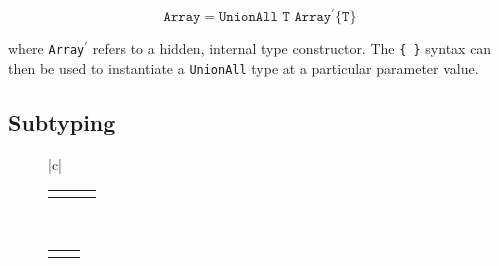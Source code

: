 \vspace{-3ex}
\[
\texttt{Array} = \texttt{UnionAll T Array$^\prime$\{T\}}
\]

\noindent
where \texttt{Array$^\prime$} refers to a hidden, internal type constructor.
The \texttt{\{ \}} syntax can then be used to instantiate a \texttt{UnionAll}
type at a particular parameter value.


\subsection{Subtyping}

\begin{figure}[!t]
  \begin{center}
    \def\arraystretch{2}
    \begin{tabular}{|c|}\hline
      \begin{tabular}{ccc}
        \AxiomC{$_A^B X^L, \Gamma\ \vdash\ T \leq S$}
        \UnaryInfC{$\Gamma\ \vdash\ \exists$ $_A^B X . T\ \leq\ S$}
        \DisplayProof

        \hspace{3ex}

        &

        \AxiomC{$_A^BX^R, \Gamma\ \vdash\ T \leq S$}
        \UnaryInfC{$\Gamma\ \vdash\ T\ \leq\ \exists$ $_A^B X . S$}
        \DisplayProof

        \hspace{3ex}

        &

        \AxiomC{}
        \UnaryInfC{$\Gamma\ \vdash\ X \leq X$}
        \DisplayProof
      \end{tabular}

      \\[8pt]

      \begin{tabular}{cc}
        \AxiomC{$^BX^L,\Gamma\ \vdash\ B \leq T$}
        \UnaryInfC{$^BX^L,\Gamma\ \vdash\ X \leq T$}
        \DisplayProof

        \hspace{3ex}

        &

        \AxiomC{$_AX^L,\Gamma\ \vdash\ T \leq A$}
        \UnaryInfC{$_AX^L,\Gamma\ \vdash\ T \leq X$}
        \DisplayProof

        \hspace{3ex}

        \\[8pt]


\end{tabular}
\end{tabular}
\end{center}
\end{figure}
